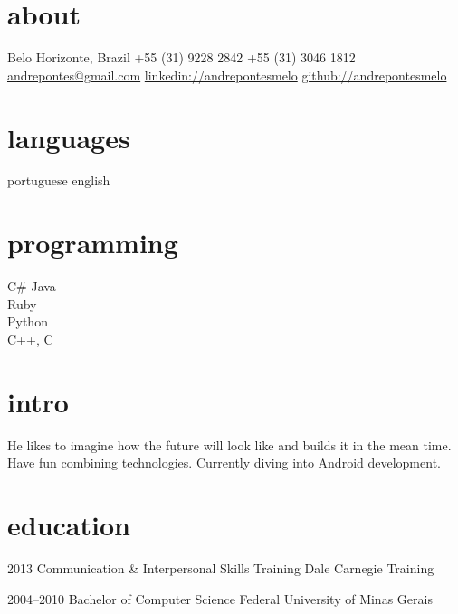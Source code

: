 \documentclass[]{friggeri-cv}
\begin{document}


\begin{aside} 
\section{about}
Belo Horizonte, Brazil
+55 (31) 9228 2842
+55 (31) 3046 1812
~
\href{mailto:andrepontes@gmail.com}{andrepontes@gmail.com}
\href{https://br.linkedin.com/in/andrepontesmelo}{linkedin://andrepontesmelo}
\href{https://github.com/andrepontesmelo}{github://andrepontesmelo}
\section{languages}
portuguese
english
\section{programming}
C\#
Java\\Ruby\\Python\\C++, C
\end{aside}

\section{intro}
He likes to imagine how the future will look like and builds it in the mean time. Have fun combining technologies. Currently diving into Android development.


\section{education}

\begin{entrylist}


\entry
{2013}
{Communication \& Interpersonal {\normalfont Skills Training}}
{Dale Carnegie Training}

\entry
{2004--2010}
{{\normalfont Bachelor of} Computer Science}
{Federal University of Minas Gerais}

\end{entrylist}
\end{document}
